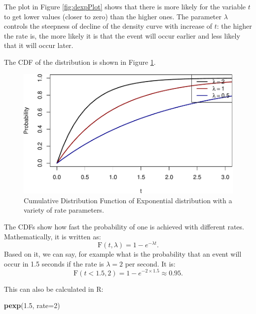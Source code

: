 \documentclass[
]{book}
\newenvironment{Shaded}{\begin{snugshade}}{\end{snugshade}}
\newcommand{\AttributeTok}[1]{\textcolor[rgb]{0.13,0.29,0.53}{#1}}
\newcommand{\DecValTok}[1]{\textcolor[rgb]{0.00,0.00,0.81}{#1}}
\newcommand{\FloatTok}[1]{\textcolor[rgb]{0.00,0.00,0.81}{#1}}
\newcommand{\FunctionTok}[1]{\textcolor[rgb]{0.13,0.29,0.53}{\textbf{#1}}}
\newcommand{\NormalTok}[1]{#1}
\theoremstyle{definition}
\theoremstyle{definition}
\theoremstyle{definition}
\theoremstyle{definition}
\theoremstyle{remark}
\begin{document}
The plot in Figure \ref{fig:dexpPlot} shows that there is more likely for the variable \(t\) to get lower values (closer to zero) than the higher ones. The parameter \(\lambda\) controls the steepness of decline of the density curve with increase of \(t\): the higher the rate is, the more likely it is that the event will occur earlier and less likely that it will occur later.

The CDF of the distribution is shown in Figure \ref{fig:pexpPlot}.

\begin{figure}
\centering
\includegraphics{Svetunkov---Statistics-for-Business-Analytics_files/figure-latex/pexpPlot-1.pdf}
\caption{\label{fig:pexpPlot}Cumulative Distribution Function of Exponential distribution with a variety of rate parameters.}
\end{figure}

The CDFs show how fast the probability of one is achieved with different rates. Mathematically, it is written as:
\begin{equation}
    \mathrm{F}(t, \lambda) = 1 - e^{- \lambda t}.
    \label{eq:ExponentialCDF}
\end{equation}
Based on it, we can say, for example what is the probability that an event will occur in 1.5 seconds if the rate is \(\lambda=2\) per second. It is:
\begin{equation*}
    \mathrm{F}(t < 1.5, 2) = 1 - e^{- 2 \times 1.5} \approx 0.95 .
\end{equation*}

This can also be calculated in R:

\begin{Shaded}
\begin{Highlighting}[]
\FunctionTok{pexp}\NormalTok{(}\FloatTok{1.5}\NormalTok{, }\AttributeTok{rate=}\DecValTok{2}\NormalTok{)}
\end{Highlighting}
\end{Shaded}
\end{document}
